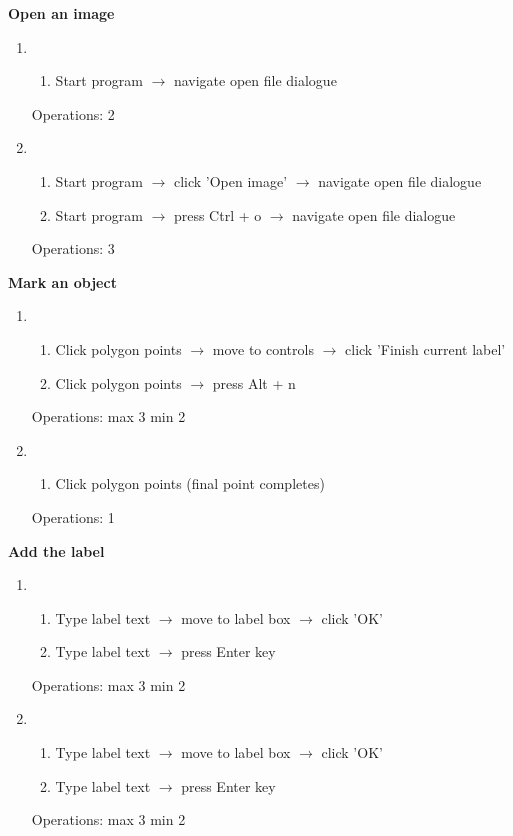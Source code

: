 \documentclass[a4paper,11pt,oneside]{article}
\begin{document}
{\bf Open an image}
\begin{enumerate}
    \item
    \begin{enumerate}
        \item Start program $\rightarrow$ navigate open file dialogue
    \end{enumerate}
    Operations: 2
    \item
    \begin{enumerate}
        \item Start program $\rightarrow$ click 'Open image' $\rightarrow$ navigate open file dialogue
        \item Start program $\rightarrow$ press Ctrl + o $\rightarrow$ navigate open file dialogue
    \end{enumerate}
    Operations: 3
\end{enumerate}

{\bf Mark an object}
\begin{enumerate}
    \item
    \begin{enumerate}
        \item Click polygon points $\rightarrow$ move to controls $\rightarrow$ click 'Finish current label'
        \item Click polygon points $\rightarrow$ press Alt + n
    \end{enumerate}
    Operations: max 3 min 2
    \item
    \begin{enumerate}
        \item Click polygon points (final point completes)
    \end{enumerate}
    Operations: 1
\end{enumerate}

{\bf Add the label}
\begin{enumerate}
    \item
    \begin{enumerate}
        \item Type label text $\rightarrow$ move to label box $\rightarrow$ click 'OK'
        \item Type label text $\rightarrow$ press Enter key
    \end{enumerate}
    Operations: max 3 min 2
    \item
    \begin{enumerate}
        \item Type label text $\rightarrow$ move to label box $\rightarrow$ click 'OK'
        \item Type label text $\rightarrow$ press Enter key
    \end{enumerate}
    Operations: max 3 min 2
\end{enumerate}
\end{document}
